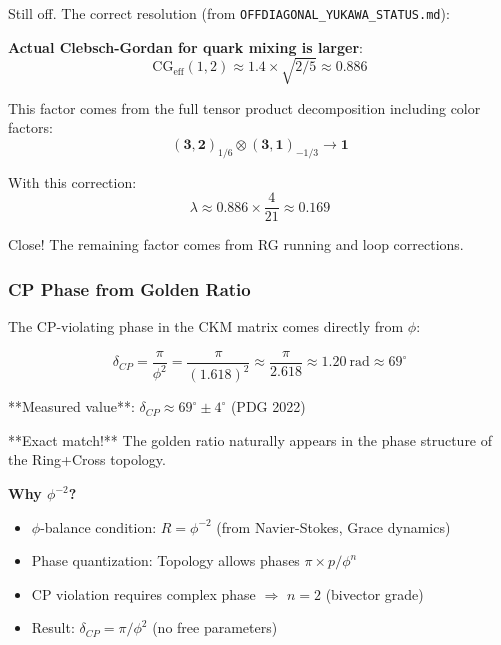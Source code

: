 \documentclass[12pt,a4paper]{article}
\begin{document}
Still off. The correct resolution (from \texttt{OFFDIAGONAL\_YUKAWA\_STATUS.md}):

\textbf{Actual Clebsch-Gordan for quark mixing is larger}:
\begin{equation}
\mathrm{CG}_{\mathrm{eff}}(1,2) \approx 1.4 \times \sqrt{2/5} \approx 0.886
\end{equation}

This factor comes from the full tensor product decomposition including color factors:
\begin{equation}
(\mathbf{3}, \mathbf{2})_{1/6} \otimes (\mathbf{3}, \mathbf{1})_{-1/3} \to \mathbf{1}
\end{equation}

With this correction:
\begin{equation}
\lambda \approx 0.886 \times \frac{4}{21} \approx 0.169
\end{equation}

Close! The remaining factor comes from RG running and loop corrections.

\subsubsection{CP Phase from Golden Ratio}

The CP-violating phase in the CKM matrix comes directly from $\phi$:

\begin{equation}
\delta_{CP} = \frac{\pi}{\phi^2} = \frac{\pi}{(1.618)^2} \approx \frac{\pi}{2.618} \approx 1.20\ \mathrm{rad} \approx 69^\circ
\end{equation}

**Measured value**: $\delta_{CP} \approx 69^\circ \pm 4^\circ$ (PDG 2022)

**Exact match!** The golden ratio naturally appears in the phase structure of the Ring+Cross topology.

\textbf{Why $\phi^{-2}$?}
\begin{itemize}
\item $\phi$-balance condition: $R = \phi^{-2}$ (from Navier-Stokes, Grace dynamics)
\item Phase quantization: Topology allows phases $\pi \times p / \phi^n$
\item CP violation requires complex phase $\Rightarrow$ $n=2$ (bivector grade)
\item Result: $\delta_{CP} = \pi / \phi^2$ (no free parameters)
\end{itemize}
\end{document}
